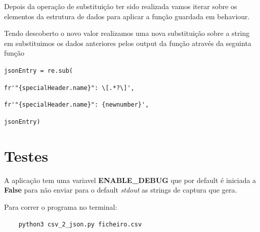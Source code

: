 \documentclass[runningheads]{llncs}
\begin{document}
\begin{equation}
\end{equation}

Depois da operação de substituição ter sido realizada vamos iterar sobre os elementos da estrutura de dados para aplicar a função guardada em behaviour.

Tendo descoberto o novo valor realizamos uma nova substituição sobre a string em substituimos os dados anteriores pelos output da função através da seguinta função



\verb|jsonEntry = re.sub(|

\verb|fr'"{specialHeader.name}": \[.*?\]',|

\verb|fr'"{specialHeader.name}": {newnumber}',|

\verb|jsonEntry)|

\newpage

\section{Testes}

A aplicação tem uma variavel \textbf{ENABLE\_DEBUG} que por default é iniciada a \textbf{False} para não enviar para o default \textit{stdout} as strings de captura que gera.

\vspace{5mm}
Para correr o programa no terminal: 
\begin{verbatim}
    python3 csv_2_json.py ficheiro.csv
\end{verbatim}
    
\end{document}
